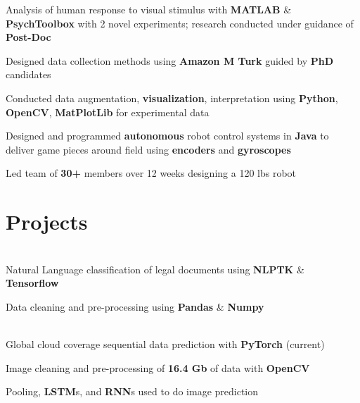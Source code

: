 \documentclass[]{chandan-cv}
\begin{document}
\begin{minipage}[t]{0.71\textwidth}
\begin{tightemize}
	\item Analysis of human response to visual stimulus with \textbf{MATLAB} \& \textbf{PsychToolbox} with 2 novel experiments; research conducted under guidance of \textbf{Post-Doc}
	\item Designed data collection methods using \textbf{Amazon M Turk} guided by \textbf{PhD} candidates
	\item Conducted data augmentation, \textbf{visualization}, interpretation using \textbf{Python}, \textbf{OpenCV}, \textbf{MatPlotLib} for experimental data
\end{tightemize}
\sectionsep

\begin{tightemize}
	\item Designed and programmed \textbf{autonomous} robot control systems in \textbf{Java} to deliver game pieces around field using \textbf{encoders} and \textbf{gyroscopes}
	\item Led team of \textbf{30+} members over 12 weeks designing a 120 lbs robot
\end{tightemize}
\sectionsep


\section{Projects}

\descript{ }
\location{ }
\\
Natural Language classification of legal documents using \textbf{NLPTK} \& \textbf{Tensorflow}
\begin{tightemize}
        \item Data cleaning and pre-processing using \textbf{Pandas} \& \textbf{Numpy}
\end{tightemize}
\\
Global cloud coverage sequential data prediction with \textbf{PyTorch} (current)
\begin{tightemize}
        \item Image cleaning and pre-processing of \textbf{16.4 Gb} of data with \textbf{OpenCV}
        \item Pooling, \textbf{LSTM}s, and \textbf{RNN}s used to do image prediction
\end{tightemize}
\sectionsep


\end{minipage}
\end{document}
